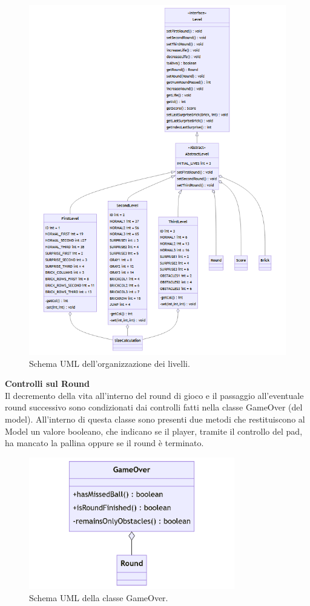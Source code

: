 \documentclass[a4paper,12pt]{report}
\begin{document}
\begin{figure}[H]
    \centering
    \includegraphics[scale=0.8]{images/Levels.png}
    \caption{Schema UML dell'organizzazione dei livelli.}
    \label{images:Levels}
\end{figure}
\noindent
\textbf{Controlli sul Round}\\
Il decremento della vita all'interno del round di gioco e il passaggio all'eventuale round successivo sono
condizionati dai controlli fatti nella classe GameOver (del model). All'interno di questa classe sono presenti due metodi che restituiscono al Model
un valore booleano, che indicano se il player, tramite il controllo del pad, ha mancato la pallina oppure se il round è terminato.
\begin{figure}[H]
    \centering
    \includegraphics[width=0.8\textwidth]{images/GameOver.png}
    \caption{Schema UML della classe GameOver.}
\end{figure}
\end{document}
